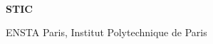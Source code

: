 \

{\vspace{7em}}

\begin{center}
  \Large{{\textbf{STIC}}}
\end{center}

{\medskip}

\begin{center}
  ENSTA Paris, Institut Polytechnique de Paris
\end{center}

{\newpage}

